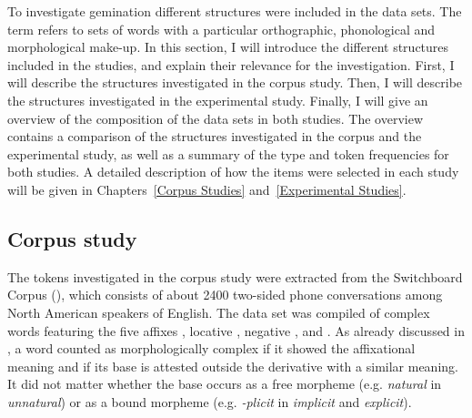 To investigate {gemination} different structures were included in the data sets. The term  refers to sets of words with a particular orthographic, phonological and morphological make-up. In this section, I will introduce the different structures included in the studies, and explain their relevance for the investigation.
 First, I will describe the structures investigated in the corpus study. Then, I will describe the structures investigated in the experimental study. Finally, I will give an overview of the composition of the data sets in both studies. The overview contains a comparison of the structures investigated in the corpus and the experimental study, as well as a summary of the type and token frequencies for both studies. A detailed description of how the items were selected in each study will be given in Chapters~\ref{Corpus Studies} and~\ref{Experimental Studies}.


\subsection{Corpus study}\label{corpus data composition}

The tokens investigated in the corpus study were extracted from the Switchboard Corpus (\citealt{Godfrey.1997}), which consists of about 2400 two-sided phone conversations among North American speakers of English.  The data set was compiled of complex words featuring the five affixes , locative , negative ,  and . As already discussed in ,  a word counted as morphologically complex if it showed the affixational meaning and if its base is attested outside the derivative with a similar meaning. It did not matter whether the base occurs as a free morpheme (e.g. \textit{natural} in \textit{unnatural}) or as a bound morpheme (e.g. \textit{-plicit} in \textit{implicit}  and  \textit{explicit}). 


